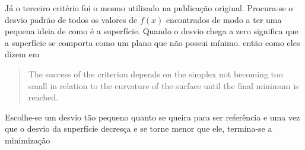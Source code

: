 Já o terceiro critério foi o mesmo utilizado na publicação original. Procura-se o desvio padrão de todos os valores de $f(x)$ encontrados de modo a ter uma pequena ideia de como é a superfície. Quando o desvio chega a zero significa que a superfície se comporta como um plano que não possui mínimo. então como eles dizem em \cite{nelder1965simplex}

\begin{quote}
The success of the criterion depends on the simplex not becoming too small in relation to the curvature of the surface until the final minimum is reached.
\end{quote} 

Escolhe-se um desvio tão pequeno quanto se queira para ser referência e uma vez que o desvio da superfície decresça e se torne menor que ele, termina-se a minimização


\newpage

